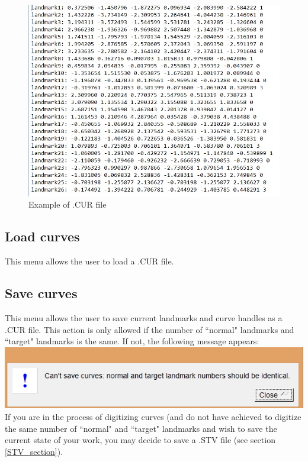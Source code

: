 \begin{figure}[t] 
  \centering
  \includegraphics[scale=0.5]{images/Landmarks/CUR_file.png} 
	\caption{Example of .CUR file}
 
\end{figure}

\subsection{Load curves}
This menu allows the user to load a .CUR file.
\subsection{Save curves}
This menu allows the user to save current landmarks and curve handles as a .CUR file. This action is only allowed if the number of ``normal" landmarks and ``target" landmarks is the same. If not, the following message appears:\\
\includegraphics[scale=0.5]{images/Landmarks/Not_identical.png}
\\
If you are in the process of digitizing curves (and do not have achieved to digitize the same number of ``normal" and ``target"  landmarks and wish to save the current state of your work, you may decide to save a .STV file (see section \ref{STV_section}).


